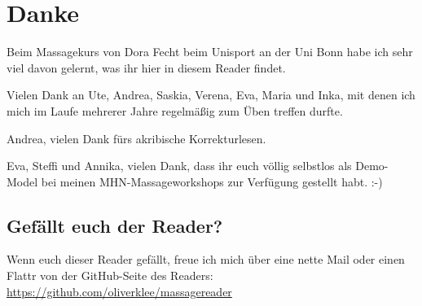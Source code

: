 \section*{Danke}

Beim Massagekurs von Dora Fecht beim Unisport an der Uni Bonn habe ich sehr viel davon gelernt, was ihr hier in diesem Reader findet.

Vielen Dank an Ute, Andrea, Saskia, Verena, Eva, Maria und Inka, mit denen ich mich im Laufe mehrerer Jahre regelmäßig zum Üben treffen durfte.

Andrea, vielen Dank fürs akribische Korrekturlesen.

Eva, Steffi und Annika, vielen Dank, dass ihr euch völlig selbstlos als Demo-Model bei meinen MHN-Massageworkshops zur Verfügung gestellt habt. :-)

\subsection*{Gefällt euch der Reader?}

Wenn euch dieser Reader gefällt, freue ich mich über eine nette Mail oder einen Flattr von der GitHub-Seite des Readers: \url{https://github.com/oliverklee/massagereader}
